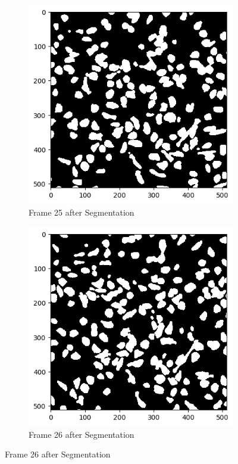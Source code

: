 \documentclass{article}
\begin{document}
\begin{figure}[h!]
  \centering
  \begin{subfigure}{0.4\textwidth}
    \includegraphics[width=\linewidth]{Report/Appendix_Images/Segmentation-B-Growth/frame_25.png}
    \caption*{Frame 25 after Segmentation}
  \end{subfigure}
  \hfill
  \begin{subfigure}{0.4\textwidth}
    \includegraphics[width=\linewidth]{Report/Appendix_Images/Segmentation-B-Growth/frame_26.png}
    \caption*{Frame 26 after Segmentation}
  \end{subfigure}


\end{figure}
\end{document}
